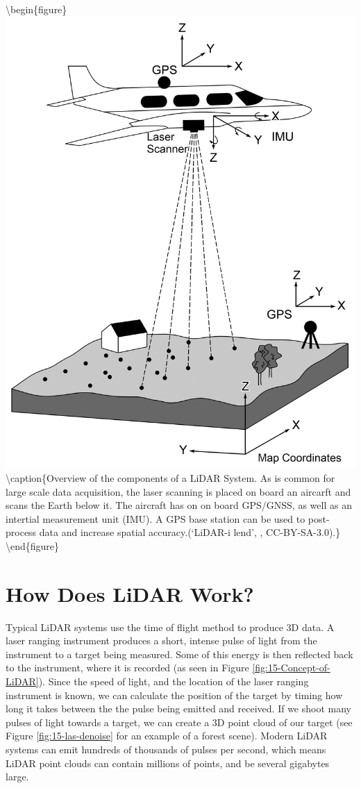 \documentclass[
]{book}
\begin{document}
\textbackslash begin\{figure\}
\includegraphics[width=0.6\linewidth]{images/15-LiDAR-System} \textbackslash caption\{Overview of the components of a LiDAR System. As is common for large scale data acquisition, the laser scanning is placed on board an aircarft and scans the Earth below it. The aircraft has on on board GPS/GNSS, as well as an intertial measurement unit (IMU). A GPS base station can be used to post-process data and increase spatial accuracy.(`LiDAR-i lend', \citet{marek9134_lidar-i_2012}, CC-BY-SA-3.0).\}\label{fig:15-LiDAR-System}
\textbackslash end\{figure\}

\hypertarget{how-does-lidar-work}{%
\section{How Does LiDAR Work?}\label{how-does-lidar-work}}

Typical LiDAR systems use the time of flight method to produce 3D data. A laser ranging instrument produces a short, intense pulse of light from the instrument to a target being measured. Some of this energy is then reflected back to the instrument, where it is recorded (as seen in Figure \ref{fig:15-Concept-of-LiDAR}). Since the speed of light, and the location of the laser ranging instrument is known, we can calculate the position of the target by timing how long it takes between the the pulse being emitted and received. If we shoot many pulses of light towards a target, we can create a 3D point cloud of our target (see Figure \ref{fig:15-las-denoise} for an example of a forest scene). Modern LiDAR systems can emit hundreds of thousands of pulses per second, which means LiDAR point clouds can contain millions of points, and be several gigabytes large.
\end{document}
